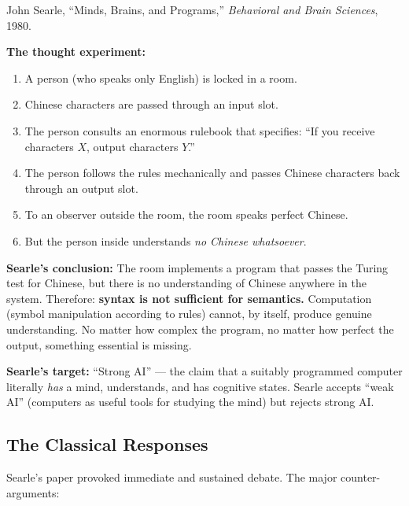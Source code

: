 \documentclass[11pt, a4paper]{article}
\begin{document}
John Searle, ``Minds, Brains, and Programs,'' \emph{Behavioral and Brain
Sciences}, 1980.

\textbf{The thought experiment:}

\begin{enumerate}[leftmargin=2em]
  \item A person (who speaks only English) is locked in a room.
  \item Chinese characters are passed through an input slot.
  \item The person consults an enormous rulebook that specifies: ``If you
    receive characters $X$, output characters $Y$.''
  \item The person follows the rules mechanically and passes Chinese
    characters back through an output slot.
  \item To an observer outside the room, the room speaks perfect Chinese.
  \item But the person inside understands \emph{no Chinese whatsoever}.
\end{enumerate}

\textbf{Searle's conclusion:} The room implements a program that passes
the Turing test for Chinese, but there is no understanding of Chinese
anywhere in the system. Therefore: \textbf{syntax is not sufficient for
semantics.} Computation (symbol manipulation according to rules) cannot,
by itself, produce genuine understanding. No matter how complex the
program, no matter how perfect the output, something essential is missing.

\textbf{Searle's target:} ``Strong AI'' --- the claim that a suitably
programmed computer literally \emph{has} a mind, understands, and has
cognitive states. Searle accepts ``weak AI'' (computers as useful tools
for studying the mind) but rejects strong AI.

\subsection{The Classical Responses}

Searle's paper provoked immediate and sustained debate. The major
counter-arguments:
\end{document}
